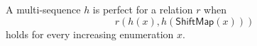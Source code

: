 \begin{definition}
A multi-sequence $h$ is perfect for a relation $r$ when
\[
r(h(x),h(\mathsf{ShiftMap}(x)))
\]
holds for every increasing enumeration $x$.
\end{definition}
